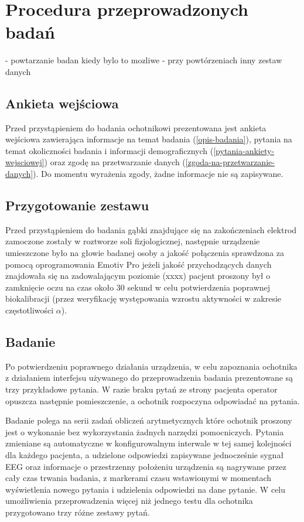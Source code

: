 \documentclass{./assets/wfis}
\begin{document}
\section{Procedura przeprowadzonych badań}\label{procedura-badan}
- powtarzanie badan kiedy bylo to mozliwe
- przy powtórzeniach inny zestaw danych
\subsection{Ankieta wejściowa}
Przed przystąpieniem do badania ochotnikowi prezentowana jest ankieta wejściowa zawierająca informacje na temat badania (\autoref{opis-badania}), pytania na temat okoliczności badania i informacji demograficznych (\autoref{pytania-ankiety-wejsciowej}) oraz zgodę na przetwarzanie danych (\autoref{zgoda-na-przetwarzanie-danych}). Do momentu wyrażenia zgody, żadne informacje nie są zapisywane.

\subsection{Przygotowanie zestawu}
Przed przystąpieniem do badania gąbki znajdujące się na zakończeniach elektrod zamoczone zostały w roztworze soli fizjologicznej, następnie urządzenie umieszczone było na głowie badanej osoby a jakość połączenia sprawdzona za pomocą oprogramowania Emotiv Pro \cite{} jeżeli jakość przychodzących danych znajdowała się na zadowalającym poziomie (xxxx) pacjent proszony był o zamknięcie oczu na czas około 30 sekund w celu potwierdzenia poprawnej biokalibracji (przez weryfikację występowania wzrostu aktywności w zakresie częstotliwości $\alpha$).

\subsection{Badanie}
Po potwierdzeniu poprawnego działania urządzenia, w celu zapoznania ochotnika z działaniem interfejsu używanego do przeprowadzenia badania prezentowane są trzy przykładowe pytania. W razie braku pytań ze strony pacjenta operator opuszcza następnie pomieszczenie, a ochotnik rozpoczyna odpowiadać na pytania.

Badanie polega na serii zadań obliczeń arytmetycznych które ochotnik proszony jest o wykonanie bez wykorzystania żadnych narzędzi pomocniczych. Pytania zmieniane są automatyczne w konfigurowalnym interwale w tej samej kolejności dla każdego pacjenta, a udzielone odpowiedzi zapisywane jednocześnie sygnał EEG oraz informacje o przestrzenny położeniu urządzenia są nagrywane przez cały czas trwania badania, z markerami czasu wstawionymi w momentach wyświetlenia nowego pytania i udzielenia odpowiedzi na dane pytanie. W celu umożliwienia przeprowadzenia więcej niż jednego testu dla ochotnika przygotowano trzy różne zestawy pytań.
\end{document}
